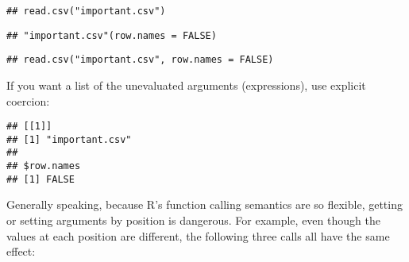 \begin{verbatim}
## read.csv("important.csv")
\end{verbatim}

\begin{Shaded}
\begin{Highlighting}[]
\NormalTok{x[}\OperatorTok{-}\NormalTok{] }
\end{Highlighting}
\end{Shaded}

\begin{verbatim}
## "important.csv"(row.names = FALSE)
\end{verbatim}

\begin{Shaded}
\begin{Highlighting}[]
\end{Highlighting}
\end{Shaded}

\begin{verbatim}
## read.csv("important.csv", row.names = FALSE)
\end{verbatim}

If you want a list of the unevaluated arguments (expressions), use
explicit coercion:

\begin{Shaded}
\begin{Highlighting}[]
\NormalTok{(x[}\OperatorTok{-}\NormalTok{])}
\end{Highlighting}
\end{Shaded}

\begin{verbatim}
## [[1]]
## [1] "important.csv"
## 
## $row.names
## [1] FALSE
\end{verbatim}

Generally speaking, because R's function calling semantics are so
flexible, getting or setting arguments by position is dangerous. For
example, even though the values at each position are different, the
following three calls all have the same effect:

\begin{Shaded}
\begin{Highlighting}[]
\StringTok{ }\NormalTok{(}\NormalTok{(}\NormalTok{, } \NormalTok{))}
\StringTok{ }\NormalTok{(}\NormalTok{(} \NormalTok{, }\NormalTok{))}
\StringTok{ }\NormalTok{(}\NormalTok{(} \NormalTok{, , }\NormalTok{))}
\end{Highlighting}
\end{Shaded}

